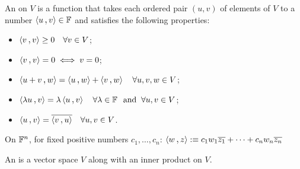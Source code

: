 \begin{mydef} 
  An  on $V$ is a function that takes each ordered pair $(u,v)$ of elements of $V$ to a number $\ip{u}{v} \in \myF$ and satisfies the following properties:
  \begin{itemize}
    \item {} $\ip{v}{v} \geq 0 \quad \forall v \in V$;
    \item {} $\ip{v}{v} = 0 \iff v=0$;
    \item {} $\ip{u+v}{w}=\ip{u}{w}+\ip{v}{w} \quad \forall u,v,w \in V$;
    \item {} $\ip{\lambda u}{v} = \lambda \ip{u}{v} \quad \forall \lambda \in \myF \myand \forall u,v \in V$;
    \item {} $\ip{u}{v} = \overline{\ip{v}{u}} \quad \forall u, v \in V$.
  \end{itemize}
\end{mydef}

\begin{example}
  On $\mathbb{F}^n$, for fixed positive numbers $c_1, \ldots, c_n$: $\ip{w}{z} :\equiv c_1 w_1 \overline{z_1} + \cdots + c_n w_n \overline{z_n}$
\end{example}

\begin{mydef}
  An  is a vector space $V$ along with an inner product on $V$.
\end{mydef}

\setcounter{thm}{5}

